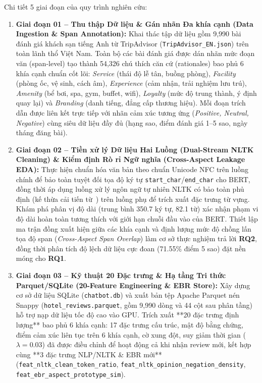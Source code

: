 \documentclass[pdflatex,sn-mathphys-num]{sn-jnl}
\theoremstyle{thmstyleone}
\theoremstyle{thmstyletwo}
\theoremstyle{thmstylethree}
\begin{document}
Chi tiết 5 giai đoạn của quy trình nghiên cứu:
\begin{enumerate}
    \item \textbf{Giai đoạn 01 -- Thu thập Dữ liệu \& Gán nhãn Đa khía cạnh (Data Ingestion \& Span Annotation):} Khai thác tập dữ liệu gồm 9,990 bài đánh giá khách sạn tiếng Anh từ TripAdvisor (\texttt{TripAdvisor\_EN.json}) trên toàn lãnh thổ Việt Nam. Toàn bộ các bài đánh giá được dán nhãn mức đoạn văn (span-level) tạo thành 54,326 chú thích căn cứ (rationales) bao phủ 6 khía cạnh chuẩn cốt lõi: \textit{Service} (thái độ lễ tân, buồng phòng), \textit{Facility} (phòng ốc, vệ sinh, cách âm), \textit{Experience} (cảm nhận, trải nghiệm lưu trú), \textit{Amenity} (bể bơi, spa, gym, buffet, wifi), \textit{Loyalty} (mức độ trung thành, ý định quay lại) và \textit{Branding} (danh tiếng, đẳng cấp thương hiệu). Mỗi đoạn trích dẫn được liên kết trực tiếp với nhãn cảm xúc tương ứng (\textit{Positive, Neutral, Negative}) cùng siêu dữ liệu đầy đủ (hạng sao, điểm đánh giá 1--5 sao, ngày tháng đăng bài).
    
    \item \textbf{Giai đoạn 02 -- Tiền xử lý Dữ liệu Hai Luồng (Dual-Stream NLTK Cleaning) \& Kiểm định Rò rỉ Ngữ nghĩa (Cross-Aspect Leakage EDA):} Thực hiện chuẩn hóa văn bản theo chuẩn Unicode NFC trên luồng chính để bảo toàn tuyệt đối tọa độ ký tự \texttt{start\_char}/\texttt{end\_char} cho BERT, đồng thời áp dụng luồng xử lý ngôn ngữ tự nhiên NLTK có bảo toàn phủ định (kế thừa cải tiến từ~\cite{bimaputra2023aspect}) trên luồng phụ để trích xuất đặc trưng từ vựng. Khám phá phân vị độ dài (trung bình 350.7 ký tự, 82.1 từ) xác nhận phạm vi độ dài hoàn toàn tương thích với giới hạn chuỗi đầu vào của BERT. Thiết lập ma trận đồng xuất hiện giữa các khía cạnh và định lượng mức độ chồng lấn tọa độ span (\textit{Cross-Aspect Span Overlap}) làm cơ sở thực nghiệm trả lời \textbf{RQ2}, đồng thời phân tích độ lệch dữ liệu cực đoan (71.55\% điểm 5 sao) đặt nền móng cho \textbf{RQ1}.
    
    \item \textbf{Giai đoạn 03 -- Kỹ thuật 20 Đặc trưng \& Hạ tầng Tri thức Parquet/SQLite (20-Feature Engineering \& EBR Store):} Xây dựng cơ sở dữ liệu SQLite (\texttt{chatbot.db}) và xuất bản tệp Apache Parquet nén Snappy (\texttt{hotel\_reviews.parquet}, gồm 9,990 dòng và 44 cột sau phân tầng) hỗ trợ nạp dữ liệu tốc độ cao vào GPU. Trích xuất **20 đặc trưng định lượng** bao phủ 6 khía cạnh: 17 đặc trưng cấu trúc, mật độ bằng chứng, điểm cảm xúc liên tục trên 6 khía cạnh, cờ xung đột, suy giảm thời gian ($\lambda = 0.03$) đã được điều chỉnh để hoạt động cả khi nhận review mới, kết hợp cùng **3 đặc trưng NLP/NLTK \& EBR mới** (\texttt{feat\_nltk\_clean\_token\_ratio}, \texttt{feat\_nltk\_opinion\_negation\_density}, \texttt{feat\_ebr\_aspect\_prototype\_sim}).
    

\end{enumerate}
\end{document}
